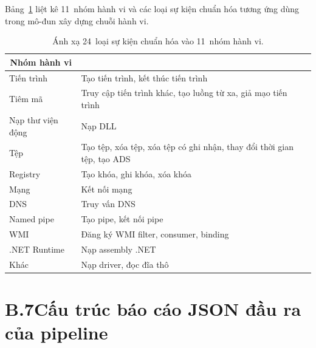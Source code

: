 \documentclass[../DoAn.tex]{subfiles}
\begin{document}
Bảng~\ref{tab:event-groups} liệt kê 11~nhóm hành vi và các loại
sự kiện chuẩn hóa tương ứng dùng trong mô-đun xây dựng chuỗi hành vi.
\begin{table}[H]
\centering
\caption{Ánh xạ 24~loại sự kiện chuẩn hóa vào 11~nhóm hành vi.}
\label{tab:event-groups}
\begin{tabular}{|l|>{\raggedright\arraybackslash}p{9cm}|}
\hline
\multicolumn{1}{|c|}{\textbf{Nhóm hành vi}} & \multicolumn{1}{c|}{\textbf{Loại sự kiện}} \\
\hline
Tiến trình         & Tạo tiến trình, kết thúc tiến trình \\
\hline
Tiêm mã            & Truy cập tiến trình khác, tạo luồng từ xa, giả mạo tiến trình \\
\hline
Nạp thư viện động & Nạp DLL \\
\hline
Tệp               & Tạo tệp, xóa tệp, xóa tệp có ghi nhận, thay đổi thời gian tệp, tạo ADS \\
\hline
Registry           & Tạo khóa, ghi khóa, xóa khóa \\
\hline
Mạng               & Kết nối mạng \\
\hline
DNS                & Truy vấn DNS \\
\hline
Named pipe         & Tạo pipe, kết nối pipe \\
\hline
WMI                & Đăng ký WMI filter, consumer, binding \\
\hline
.NET Runtime       & Nạp assembly .NET \\
\hline
Khác               & Nạp driver, đọc đĩa thô \\
\hline
\end{tabular}
\end{table}
\section*{B.7\quad Cấu trúc báo cáo JSON đầu ra của pipeline}
\end{document}
